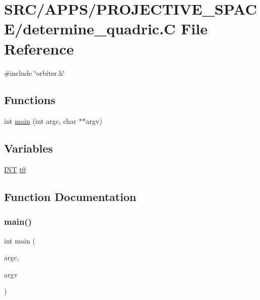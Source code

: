 \hypertarget{determine__quadric_8_c}{}\section{S\+R\+C/\+A\+P\+P\+S/\+P\+R\+O\+J\+E\+C\+T\+I\+V\+E\+\_\+\+S\+P\+A\+C\+E/determine\+\_\+quadric.C File Reference}
\label{determine__quadric_8_c}
{\ttfamily \#include \char`\"{}orbiter.\+h\char`\"{}}\newline
\subsection*{Functions}
\begin{DoxyCompactItemize}
\item 
int \mbox{\hyperlink{determine__quadric_8_c_a3c04138a5bfe5d72780bb7e82a18e627}{main}} (int argc, char $\ast$$\ast$argv)
\end{DoxyCompactItemize}
\subsection*{Variables}
\begin{DoxyCompactItemize}
\item 
\mbox{\hyperlink{galois_8h_a09fddde158a3a20bd2dcadb609de11dc}{I\+NT}} \mbox{\hyperlink{determine__quadric_8_c_a4268f4fe222ffb119218a0199f5e1904}{t0}}
\end{DoxyCompactItemize}


\subsection{Function Documentation}
\mbox{\label{determine__quadric_8_c_a3c04138a5bfe5d72780bb7e82a18e627}} 
\subsubsection{\texorpdfstring{main()}{main()}}
{\footnotesize\ttfamily int main (\begin{DoxyParamCaption}\item[{int}]{argc,  }\item[{char $\ast$$\ast$}]{argv }\end{DoxyParamCaption})}



